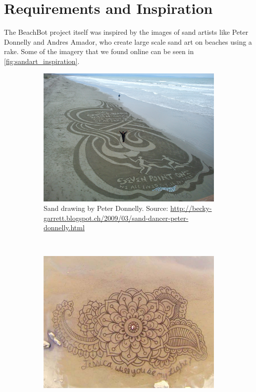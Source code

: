 \chapter{Requirements and Inspiration}

The BeachBot project itself was inspired by the images of sand artists like Peter Donnelly and Andres Amador, who create large scale sand art on beaches using a rake. Some of the imagery that we found online can be seen in \autoref{fig:sandart_inspiration}.

\begin{figure}
\centering
\begin{subfigure}[c]{1\textwidth}
\includegraphics[width=\textwidth]{images/requirements_inspiration/donnelly_1.jpg} 
\caption{Sand drawing by Peter Donnelly. Source: \url{http://becky-garrett.blogspot.ch/2009/03/sand-dancer-peter-donnelly.html}}
\end{subfigure}
\\
\begin{subfigure}[b]{0.46\textwidth}
\includegraphics[width=\textwidth]{images/requirements_inspiration/andres_armador_1.jpg} 

\end{subfigure}
\end{figure}
